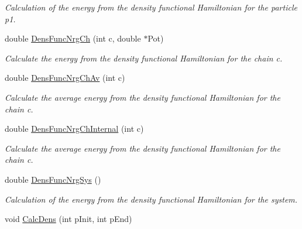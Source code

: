 \begin{DoxyCompactItemize}
\begin{DoxyCompactList}\small\item\em \-Calculation of the energy from the density functional \-Hamiltonian for the particle p1. \end{DoxyCompactList}\item 
double \hyperlink{classForces_ad288fce3211ed5cafbe899b4d3ca08f5}{\-Dens\-Func\-Nrg\-Ch} (int c, double $\ast$\-Pot)
\begin{DoxyCompactList}\small\item\em \-Calculate the energy from the density functional \-Hamiltonian for the chain c. \end{DoxyCompactList}\item 
\hypertarget{classForces_a3d6dfad06fbcd3a6b9f84b2ccd40f1ef}{double \hyperlink{classForces_a3d6dfad06fbcd3a6b9f84b2ccd40f1ef}{\-Dens\-Func\-Nrg\-Ch\-Av} (int c)}\label{classForces_a3d6dfad06fbcd3a6b9f84b2ccd40f1ef}

\begin{DoxyCompactList}\small\item\em \-Calculate the average energy from the density functional \-Hamiltonian for the chain c. \end{DoxyCompactList}\item 
\hypertarget{classForces_a424676c9ec7046ecef5f6df4a4a104e8}{double \hyperlink{classForces_a424676c9ec7046ecef5f6df4a4a104e8}{\-Dens\-Func\-Nrg\-Ch\-Internal} (int c)}\label{classForces_a424676c9ec7046ecef5f6df4a4a104e8}

\begin{DoxyCompactList}\small\item\em \-Calculate the average energy from the density functional \-Hamiltonian for the chain c. \end{DoxyCompactList}\item 
\hypertarget{classForces_ad6b09c65169c95c3aff47220ad8327c6}{double \hyperlink{classForces_ad6b09c65169c95c3aff47220ad8327c6}{\-Dens\-Func\-Nrg\-Sys} ()}\label{classForces_ad6b09c65169c95c3aff47220ad8327c6}

\begin{DoxyCompactList}\small\item\em \-Calculation of the energy from the density functional \-Hamiltonian for the system. \end{DoxyCompactList}\item 
\hypertarget{classForces_af84f3585b204886f9166af82c0a229ac}{void \hyperlink{classForces_af84f3585b204886f9166af82c0a229ac}{\-Calc\-Dens} (int p\-Init, int p\-End)}\label{classForces_af84f3585b204886f9166af82c0a229ac}


\end{DoxyCompactItemize}
